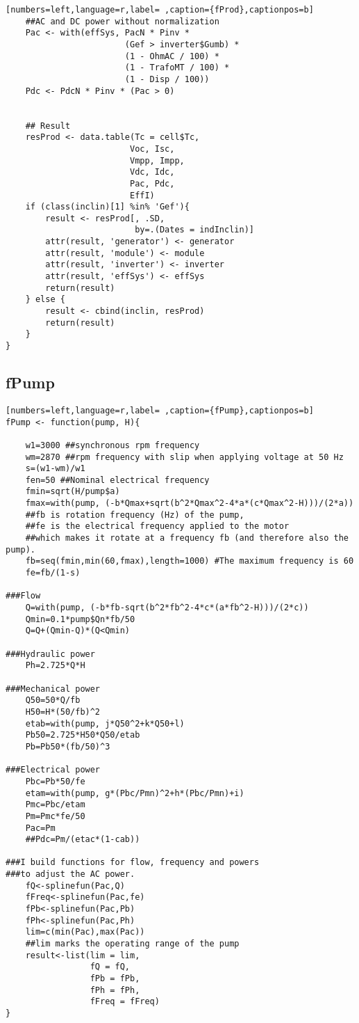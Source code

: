 \begin{lstlisting}[numbers=left,language=r,label= ,caption={fProd},captionpos=b]
    ##AC and DC power without normalization
    Pac <- with(effSys, PacN * Pinv *
                        (Gef > inverter$Gumb) *
                        (1 - OhmAC / 100) *
                        (1 - TrafoMT / 100) *
                        (1 - Disp / 100))
    Pdc <- PdcN * Pinv * (Pac > 0)


    ## Result
    resProd <- data.table(Tc = cell$Tc,
                         Voc, Isc,
                         Vmpp, Impp,
                         Vdc, Idc,
                         Pac, Pdc,
                         EffI)
    if (class(inclin)[1] %in% 'Gef'){
        result <- resProd[, .SD,
                          by=.(Dates = indInclin)]
        attr(result, 'generator') <- generator
        attr(result, 'module') <- module
        attr(result, 'inverter') <- inverter
        attr(result, 'effSys') <- effSys
        return(result)
    } else {
        result <- cbind(inclin, resProd)
        return(result)
    }
}
\end{lstlisting}
\subsection{fPump}
\label{sec:orgec050d5}
\begin{lstlisting}[numbers=left,language=r,label= ,caption={fPump},captionpos=b]
fPump <- function(pump, H){

    w1=3000 ##synchronous rpm frequency
    wm=2870 ##rpm frequency with slip when applying voltage at 50 Hz
    s=(w1-wm)/w1
    fen=50 ##Nominal electrical frequency
    fmin=sqrt(H/pump$a)
    fmax=with(pump, (-b*Qmax+sqrt(b^2*Qmax^2-4*a*(c*Qmax^2-H)))/(2*a))
    ##fb is rotation frequency (Hz) of the pump,  
    ##fe is the electrical frequency applied to the motor
    ##which makes it rotate at a frequency fb (and therefore also the pump).
    fb=seq(fmin,min(60,fmax),length=1000) #The maximum frequency is 60
    fe=fb/(1-s)

###Flow
    Q=with(pump, (-b*fb-sqrt(b^2*fb^2-4*c*(a*fb^2-H)))/(2*c))
    Qmin=0.1*pump$Qn*fb/50
    Q=Q+(Qmin-Q)*(Q<Qmin)

###Hydraulic power
    Ph=2.725*Q*H

###Mechanical power
    Q50=50*Q/fb
    H50=H*(50/fb)^2
    etab=with(pump, j*Q50^2+k*Q50+l)
    Pb50=2.725*H50*Q50/etab
    Pb=Pb50*(fb/50)^3

###Electrical power
    Pbc=Pb*50/fe
    etam=with(pump, g*(Pbc/Pmn)^2+h*(Pbc/Pmn)+i)
    Pmc=Pbc/etam
    Pm=Pmc*fe/50
    Pac=Pm
    ##Pdc=Pm/(etac*(1-cab))

###I build functions for flow, frequency and powers
###to adjust the AC power.
    fQ<-splinefun(Pac,Q)
    fFreq<-splinefun(Pac,fe)
    fPb<-splinefun(Pac,Pb)
    fPh<-splinefun(Pac,Ph)
    lim=c(min(Pac),max(Pac))
    ##lim marks the operating range of the pump
    result<-list(lim = lim,
                 fQ = fQ,
                 fPb = fPb,
                 fPh = fPh,
                 fFreq = fFreq)
}
\end{lstlisting}
